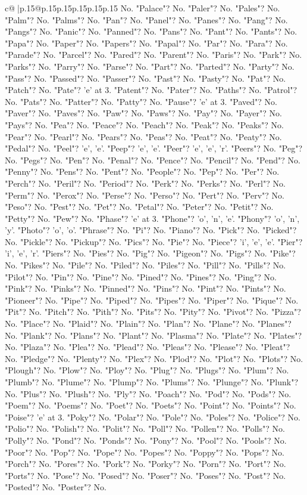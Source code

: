 \documentclass{article}
\begin{document}
{\begin{supertabular}{c@{$\;$}|p{.15\linewidth}@{}p{.15\linewidth}p{.15\linewidth}p{.15\linewidth}p{.15\linewidth}p{.15\linewidth}}
{{{No. "Palace"? No. "Paler"? No. "Pales"? No. "Palm"? No. "Palms"? No. "Pan"? No. "Panel"? No. "Panes"? No. "Pang"? No. "Pangs"? No. "Panic"? No. "Panned"? No. "Pans"? No. "Pant"? No. "Pants"? No. "Papa"? No. "Paper"? No. "Papers"? No. "Papal"? No. "Par"? No. "Para"? No. "Parade"? No. "Parcel"? No. "Pared"? No. "Parent"? No. "Paris"? No. "Park"? No. "Parks"? No. "Parry"? No. "Parse"? No. "Part"? No. "Parted"? No. "Party"? No. "Pass"? No. "Passed"? No. "Passer"? No. "Past"? No. "Pasty"? No. "Pat"? No. "Patch"? No. "Pate"? 'e' at 3. "Patent"? No. "Pater"? No. "Paths"? No. "Patrol"? No. "Pats"? No. "Patter"? No. "Patty"? No. "Pause"? 'e' at 3. "Paved"? No. "Paver"? No. "Paves"? No. "Paw"? No. "Paws"? No. "Pay"? No. "Payer"? No. "Pays"? No. "Pea"? No. "Peace"? No. "Peach"? No. "Peak"? No. "Peaks"? No. "Pear"? No. "Pearl"? No. "Pears"? No. "Peas"? No. "Peat"? No. "Peaty"? No. "Pedal"? No. "Peel"? 'e', 'e'. "Peep"? 'e', 'e'. "Peer"? 'e', 'e', 'r'. "Peers"? No. "Peg"? No. "Pegs"? No. "Pen"? No. "Penal"? No. "Pence"? No. "Pencil"? No. "Pend"? No. "Penny"? No. "Pens"? No. "Pent"? No. "People"? No. "Pep"? No. "Per"? No. "Perch"? No. "Peril"? No. "Period"? No. "Perk"? No. "Perks"? No. "Perl"? No. "Perm"? No. "Perox"? No. "Perse"? No. "Perso"? No. "Pert"? No. "Perv"? No. "Peso"? No. "Pest"? No. "Pet"? No. "Petal"? No. "Peter"? No. "Petit"? No. "Petty"? No. "Pew"? No. "Phase"? 'e' at 3. "Phone"? 'o', 'n', 'e'. "Phony"? 'o', 'n', 'y'. "Photo"? 'o', 'o'. "Phrase"? No. "Pi"? No. "Piano"? No. "Pick"? No. "Picked"? No. "Pickle"? No. "Pickup"? No. "Pics"? No. "Pie"? No. "Piece"? 'i', 'e', 'e'. "Pier"? 'i', 'e', 'r'. "Piers"? No. "Pies"? No. "Pig"? No. "Pigeon"? No. "Pigs"? No. "Pike"? No. "Pikes"? No. "Pile"? No. "Piled"? No. "Piles"? No. "Pill"? No. "Pills"? No. "Pilot"? No. "Pin"? No. "Pine"? No. "Pined"? No. "Pines"? No. "Ping"? No. "Pink"? No. "Pinks"? No. "Pinned"? No. "Pins"? No. "Pint"? No. "Pints"? No. "Pioneer"? No. "Pipe"? No. "Piped"? No. "Pipes"? No. "Piper"? No. "Pique"? No. "Pit"? No. "Pitch"? No. "Pith"? No. "Pits"? No. "Pity"? No. "Pivot"? No. "Pizza"? No. "Place"? No. "Plaid"? No. "Plain"? No. "Plan"? No. "Plane"? No. "Planes"? No. "Plank"? No. "Plans"? No. "Plant"? No. "Plasma"? No. "Plate"? No. "Plates"? No. "Plaza"? No. "Plea"? No. "Plead"? No. "Pleas"? No. "Please"? No. "Pleat"? No. "Pledge"? No. "Plenty"? No. "Plex"? No. "Plod"? No. "Plot"? No. "Plots"? No. "Plough"? No. "Plow"? No. "Ploy"? No. "Plug"? No. "Plugs"? No. "Plum"? No. "Plumb"? No. "Plume"? No. "Plump"? No. "Plums"? No. "Plunge"? No. "Plunk"? No. "Plus"? No. "Plush"? No. "Ply"? No. "Poach"? No. "Pod"? No. "Pods"? No. "Poem"? No. "Poems"? No. "Poet"? No. "Poets"? No. "Point"? No. "Points"? No. "Poise"? 'e' at 3. "Poky"? No. "Polar"? No. "Pole"? No. "Poles"? No. "Police"? No. "Polio"? No. "Polish"? No. "Polit"? No. "Poll"? No. "Pollen"? No. "Polls"? No. "Polly"? No. "Pond"? No. "Ponds"? No. "Pony"? No. "Pool"? No. "Pools"? No. "Poor"? No. "Pop"? No. "Pope"? No. "Popes"? No. "Poppy"? No. "Pops"? No. "Porch"? No. "Pores"? No. "Pork"? No. "Porky"? No. "Porn"? No. "Port"? No. "Ports"? No. "Pose"? No. "Posed"? No. "Poser"? No. "Poses"? No. "Post"? No. "Posted"? No. "Poster"? No. }}}
\end{supertabular}}
\end{document}
